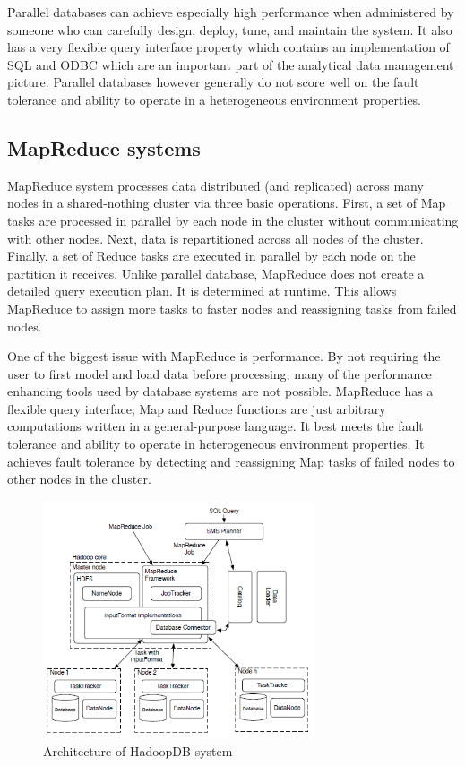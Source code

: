 \documentclass[9pt,twocolumn,twoside]{../../styles/osajnl}
\begin{document}
Parallel databases can achieve especially high performance when administered by someone who can carefully design, deploy, tune, and maintain the system. It also has a very flexible query interface property which contains an implementation of SQL and ODBC which are an important part of the analytical data management picture. Parallel databases however generally do not score well on the fault tolerance and ability to operate in a heterogeneous environment properties. 
    
\subsection{MapReduce systems}
MapReduce system processes data distributed (and replicated) across many nodes in a shared-nothing cluster via three basic operations. First, a set of Map tasks are processed in parallel by each node in the cluster without communicating with other nodes. Next, data is repartitioned across all nodes of the cluster. Finally, a set of Reduce tasks are executed in parallel by each node on the partition it receives. Unlike parallel database, MapReduce does not create a detailed query execution plan. It is determined at runtime. This allows MapReduce to assign more tasks to faster nodes and reassigning tasks from failed nodes. 

One of the biggest issue with MapReduce is performance. By not requiring the user to first model and load data before processing, many of the performance enhancing tools used by database systems are not possible. MapReduce has a flexible query interface; Map and Reduce functions are just arbitrary computations written in a general-purpose language. It best meets the fault tolerance and ability to operate in heterogeneous environment properties. It achieves fault tolerance by detecting and reassigning Map tasks of failed nodes to other
nodes in the cluster.

\begin{figure}[h]
    \centering
    \includegraphics[width=8cm]{images/hadoopDB.png}
    \caption{Architecture of HadoopDB system}
\end{figure}
\end{document}
